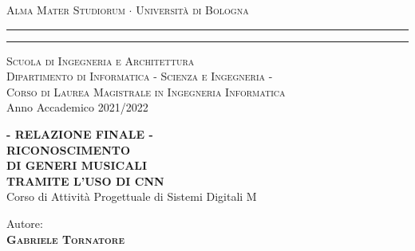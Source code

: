 \begin{titlepage}
\begin{center}
    {{\Large{\textsc{Alma Mater Studiorum $\cdot$ Universit\`a di
    Bologna}}}}
	\rule[0.1cm]{15.8cm}{0.1mm}
    \rule[0.5cm]{15.8cm}{0.6mm}
    {\normalsize{\textsc { Scuola di Ingegneria e Architettura\\
    \vspace{5mm}
    Dipartimento di Informatica - Scienza e Ingegneria -\\
    \vspace{5mm}
    Corso di Laurea Magistrale in Ingegneria Informatica}}}\\
	\vspace{10mm}
	{\small{\sc Anno Accademico 2021/2022}}%
\end{center}
\vspace{10mm}
\begin{center}
    {\LARGE\textbf{- RELAZIONE FINALE -}}\\
    \vspace{3mm}
    {\LARGE\textbf{RICONOSCIMENTO}}\\
    \vspace{3mm}
    {\LARGE\textbf{DI GENERI MUSICALI}}\\
    \vspace{3mm}
    {\LARGE{\bf TRAMITE L'USO DI CNN}}\\
    \vspace{10mm} {\large{\sc Corso di Attività Progettuale di Sistemi Digitali M}}
\end{center}
\vfill
\par
\noindent
\begin{minipage}[t]{0.47\textwidth}
    {\large{\sc Autore:}\\
    {\bf \textsc{Gabriele Tornatore}}}\\
\end{minipage}
\vspace{20mm}
\end{titlepage}
\restoregeometry
